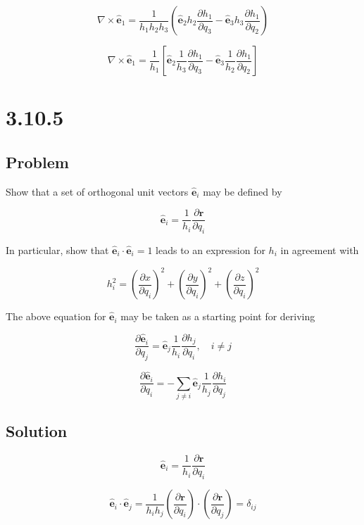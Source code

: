 \documentclass[12pt]{article}
\begin{document}
\[
    \nabla \times \hat{\mathbf{e}}_1 = \frac{1}{h_1 h_2 h_3}
    \left(
    \hat{\mathbf{e}}_2 h_2 \frac{\partial h_1}{\partial q_3}
    - \hat{\mathbf{e}}_3 h_3 \frac{\partial h_1}{\partial q_2}
    \right)
\]

\[
    \nabla \times \hat{\mathbf{e}}_1 = \frac{1}{h_1}
    \left[
        \hat{\mathbf{e}}_2 \frac{1}{h_3} \frac{\partial h_1}{\partial q_3}
        - \hat{\mathbf{e}}_3  \frac{1}{h_2}  \frac{\partial h_1}{\partial q_2}
        \right]
\]

\section{3.10.5}

\subsection{Problem}

Show that a set of orthogonal unit vectors \(\hat{\mathbf{e}}_i\) may be defined by

\[
    \hat{\mathbf{e}}_i = \frac{1}{h_i} \frac{\partial \textbf{r}}{\partial q_i}
\]

In particular, show that \(\hat{\mathbf{e}}_i \cdot \hat{\mathbf{e}}_i = 1\)  leads to an expression for
\(h_i\) in agreement with

\[
    h_i^2 = {\left(\frac{\partial x}{\partial q_i}\right)}^2
    + {\left(\frac{\partial y}{\partial q_i}\right)}^2 + {\left(\frac{\partial z}{\partial q_i}\right)}^2
\]

The above equation for \(\hat{\mathbf{e}}_i\) may be taken as a starting point for deriving

\[
    \frac{\partial \hat{\mathbf{e}}_i}{\partial q_j}
    = \hat{\mathbf{e}}_j \frac{1}{h_i} \frac{\partial h_j}{\partial q_i}, \quad i \neq j
\]

\[
    \frac{\partial \hat{\mathbf{e}}_i}{\partial q_i}
    = - \sum_{j \neq i} \hat{\mathbf{e}}_j \frac{1}{h_j} \frac{\partial h_i}{\partial q_j}
\]

\subsection{Solution}

\[
    \hat{\mathbf{e}}_i = \frac{1}{h_i} \frac{\partial \textbf{r}}{\partial q_i}
\]

\[
    \hat{\mathbf{e}}_i \cdot \hat{\mathbf{e}}_j = \frac{1}{h_i h_j}
    \left(\frac{\partial \textbf{r}}{\partial q_i}\right)
    \cdot \left(\frac{\partial \textbf{r}}{\partial q_j}\right)  = \delta_{ij}
\]
\end{document}
